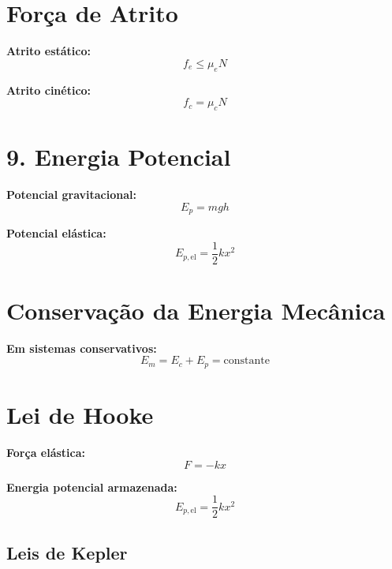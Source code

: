 \documentclass[a4paper,12pt]{article}
\begin{document}
\begin{multicols}{2}
\section{Força de Atrito}

\textbf{Atrito estático:}
\begin{equation*}
  f_e \leq \mu_e N
\end{equation*}

\textbf{Atrito cinético:}
\begin{equation*}
  f_c = \mu_c N
\end{equation*}

\section{9. Energia Potencial}

\textbf{Potencial gravitacional:}
\begin{equation*}
  E_p = m g h
\end{equation*}

\textbf{Potencial elástica:}
\begin{equation*}
  E_{p,\text{el}} = \frac{1}{2} k x^2
\end{equation*}

\section{Conservação da Energia Mecânica}

\textbf{Em sistemas conservativos:}
\begin{equation*}
  E_m = E_c + E_p = \text{constante}
\end{equation*}

\section{Lei de Hooke}

\textbf{Força elástica:}
\begin{equation*}
  F = -k x
\end{equation*}

\textbf{Energia potencial armazenada:}
\begin{equation*}
  E_{p,\text{el}} = \frac{1}{2} k x^2
\end{equation*}

\subsection{Leis de Kepler}


\end{multicols}
\end{document}
